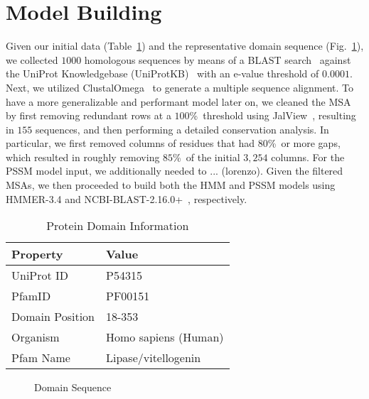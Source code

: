 
\section{Model Building}

Given our initial data (Table~\ref{tab:protein_info}) and the representative domain sequence (Fig.~\ref{fig:sequence}), we collected $1000$ homologous sequences by means of a BLAST search~\cite{blast} against the UniProt Knowledgebase (UniProtKB)~\cite{uniprot} with an e-value threshold of $0.0001$. Next, we utilized ClustalOmega~\cite{clustalomega} to generate a multiple sequence alignment. To have a more generalizable and performant model later on, we cleaned the MSA by first removing redundant rows at a $100$\%\ threshold using JalView~\cite{jalview}, resulting in $155$ sequences, and then performing a detailed conservation analysis. In particular, we first removed columns of residues that had $80$\%\ or more gaps, which resulted in roughly removing $85$\%\ of the initial $3,254$ columns. For the PSSM model input, we additionally needed to ... (lorenzo). Given the filtered MSAs, we then proceeded to build both the HMM and PSSM models using HMMER-3.4 and NCBI-BLAST-2.16.0+~\cite{blast}, respectively.

\begin{table}[h]
    \centering
    \caption{Protein Domain Information}
    \label{tab:protein_info}
    \begin{tabular}{ll}
        \toprule
        \textbf{Property} & \textbf{Value} \\
        \midrule
        UniProt ID & P54315 \\
        PfamID & PF00151 \\
        Domain Position & 18-353 \\
        Organism & Homo sapiens (Human) \\
        Pfam Name & Lipase/vitellogenin \\
        \bottomrule
    \end{tabular}
\end{table}

\begin{figure}[h]
    \centering
    \caption{Domain Sequence}
    \label{fig:sequence}
    \footnotesize
\end{figure}